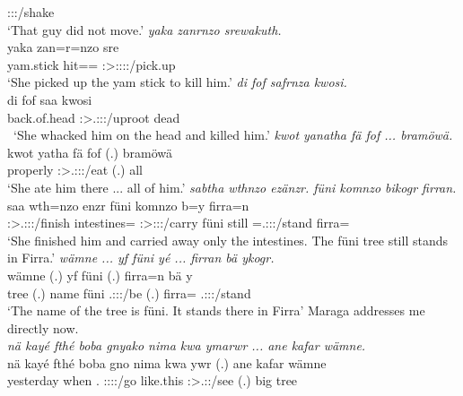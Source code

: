 \begin{exe}
	\Neg{} \Sg:\Sbj:\Pst:\Pfv/shake \Dem{}\\
	\trans `That guy did not move.'
	\emph{yaka zanrnzo srewakuth.}\\
	\gll yaka zan=r=nzo sre\\
	yam.stick hit=\Purp=\Only{} \Sg:\Sbj>\Tsg:\Masc:\Obj:\Irr:\Pfv/pick.up\\
	\trans `She picked up the yam stick to kill him.'
	\emph{di fof safrnza kwosi.}\\
	\gll di fof saa kwosi\\
	{back.of.head} \Emph{} \Sg:\Sbj>\Tsg.\Masc:\Obj:\Pst:\Pfv/uproot dead\\\
	\trans `She whacked him on the head and killed him.'
	\emph{kwot yanatha fä fof ... bramöwä.}\\
	\gll kwot yatha fä fof (.) bramöwä\\
	properly \Sg:\Sbj>\Tsg.\Masc:\Obj:\Pst:\Ipfv/eat \Dist{} \Emph{} (.) all\\
	\trans `She ate him there ... all of him.'
	\emph{sabtha wthnzo ezänzr. füni komnzo bikogr firran.}\\
	\gll saa wth=nzo enzr füni komnzo b=y firra=n\\
	\Sg:\Sbj>\Tsg.\Masc:\Obj:\Pst:\Pfv/finish intestines=\Only{} \Stsg:\Sbj>\Stpl:\Obj:\Nonpast:\Ipfv/carry füni  still \Med=\Tsg.\Masc:\Sbj:\Nonpast:\Stat/stand firra=\Loc{}\\
	\trans `She finished him and carried away only the intestines. The füni tree still stands in Firra.'
\exi{51}
	\emph{wämne ... yf füni yé ... firran bä ykogr.}\\
	\gll wämne (.) yf füni  (.) firra=n bä y\\
	tree (.) name füni \Tsg.\Masc:\Sbj:\Nonpast:\Ipfv/be (.) firra=\Loc{} \Med{} \Tsg.\Masc:\Sbj:\Nonpast:\Stat/stand\\
	\trans `The name of the tree is füni. It stands there in Firra'
\exi{52}
	{\footnotesize{Maraga addresses me directly now.}}\\
	\emph{nä kayé fthé boba gnyako nima kwa ymarwr ... ane kafar wämne.}\\
	\gll nä kayé fthé boba gn\stem{yak}o nima kwa y\stem{mar}wr (.) ane kafar wämne\\
	\Indf{} yesterday when \Med.\All{} \Ssg:\Sbj:\Imp:\Ipfv:\Andat/go {like.this} \Fut{} \Stsg:\Sbj>\Tsg.\Masc:\Nonpast:\Ipfv/see (.) \Dem{} big tree\\

\end{exe}
